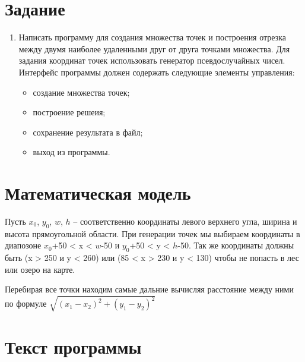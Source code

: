 \documentclass[14pt, a4paper]{extreport}
\begin{document}
\author{Савонин~М.В.}
\maketitle

\chapter{Задание}

\begin{enumerate}

	\item
	Написать программу для создания множества точек и построения отрезка между двумя наиболее удаленными друг от друга точками множества. Для задания координат точек использовать генератор псевдослучайных чисел. Интерфейс программы должен содержать следующие элементы управления:
	\begin{itemize}
		\item создание множества точек;
		\item построение решеия;
		\item сохранение результата в файл;
		\item выход из программы.
	\end{itemize}

\end{enumerate}

\chapter{Математическая модель}

Пусть $x_0$, $y_0$, $w$, $h$ -- соответственно координаты левого верхнего угла, ширина и высота прямоугольной области.
При генерации точек мы выбираем координаты в диапозоне $x_0$+50 < x < $w$-50 и $y_0$+50 < y < $h$-50.
Так же координаты должны быть (x > 250 и y < 260) или (85 < x > 230 и y < 130) чтобы не попасть в лес или озеро на карте.
\par Перебирая все точки находим самые дальние вычисляя расстояние между ними по формуле $ \sqrt{\left(x_1-x_2\right)^2+\left(y_1-y_2\right)^2} $

\chapter{Текст программы}
\end{document}
